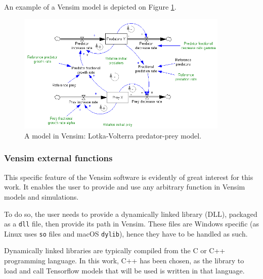 An example of a Vensim model is depicted on Figure \ref{fig:vensim-model-example}.

\begin{figure}[h!]
    \includegraphics[width=0.9\textwidth]{resources/images/vensim-model-example.png}
    \caption{A model in Vensim: Lotka-Volterra predator-prey model.}
    \label{fig:vensim-model-example}
\end{figure}

\subsubsection{Vensim external functions}

This specific feature of the Vensim software is evidently of great interest for this work. It enables the user to provide and use any arbitrary function in Vensim models and simulations.

To do so, the user needs to provide a dynamically linked library (DLL), packaged as a \texttt{dll} file, then provide its path in Vensim. These files are Windows specific (as Linux uses \texttt{so} files and macOS \texttt{dylib}), hence they have to be handled as such.

Dynamically linked libraries are typically compiled from the C or C++ programming language. In this work, C++ has been chosen, as the library to load and call Tensorflow models that will be used is written in that language.

